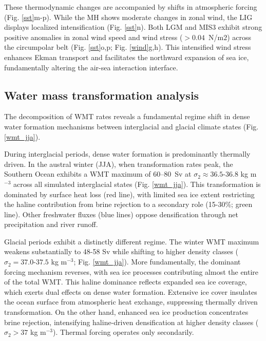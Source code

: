 \documentclass[pdflatex,sn-nature]{sn-jnl}
\begin{document}
These thermodynamic changes are accompanied by shifts in atmospheric forcing (Fig. \ref{sst}m-p). While the MH shows moderate changes in zonal wind, the LIG displays localized intensification (Fig. \ref{sst}n). Both LGM and MIS3 exhibit strong positive anomalies in zonal wind speed and wind stress ($>0.04$~N/m$2$) across the circumpolar belt (Fig. \ref{sst}o,p; Fig. \ref{wind}g,h). This intensified wind stress enhances Ekman transport and facilitates the northward expansion of sea ice, fundamentally altering the air-sea interaction interface.







\subsection{Water mass transformation analysis}



The decomposition of WMT rates reveals a fundamental regime shift in dense water formation mechanisms between interglacial and glacial climate states (Fig. \ref{wmt_jja}).

During interglacial periods, dense water formation is predominantly thermally driven. In the austral winter (JJA), when transformation rates peak, the Southern Ocean exhibits a WMT maximum of 60--80~Sv at $\sigma_2 \approx 36.5$-$36.8$ kg m$^{-3}$ across all simulated interglacial states (Fig. \ref{wmt_jja}). This transformation is dominated by surface heat loss (red line), with limited sea ice extent restricting the haline contribution from brine rejection to a secondary role (15-30\%; green line). Other freshwater fluxes (blue lines) oppose densification through net precipitation and river runoff.

Glacial periods exhibit a distinctly different regime. The winter WMT maximum weakens substantially to 48-58 Sv while shifting to higher density classes ($\sigma_2 = 37.0$-$37.5$ kg m$^{-3}$; Fig. \ref{wmt_jja}). More fundamentally, the dominant forcing mechanism reverses, with sea ice processes contributing almost the entire of  the total WMT. This haline dominance reflects expanded sea ice coverage, which exerts dual effects on dense water formation.  Extensive ice cover insulates the ocean surface from atmospheric heat exchange, suppressing thermally driven transformation. On the other hand, enhanced sea ice production concentrates brine rejection, intensifying haline-driven densification at higher density classes ($\sigma_2 > 37$ kg m$^{-3}$). Thermal forcing operates only secondarily.
\end{document}
